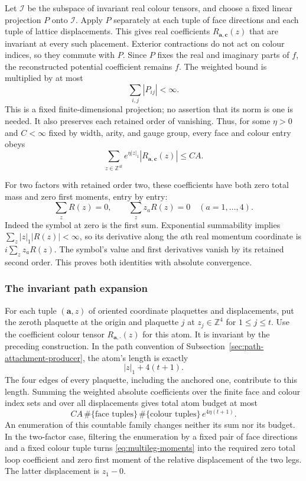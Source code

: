 Let $\mathcal I$ be the subspace of invariant real colour tensors,
and choose a fixed linear projection $P$ onto $\mathcal I$.
Apply $P$ separately at each tuple of face directions and each
tuple of lattice displacements. This gives real coefficients
$R_{\mathbf a,\mathbf c}(z)$ that are invariant at every such
placement. Exterior contractions do not act on colour indices,
so they commute with $P$. Since $P$ fixes the real and imaginary
parts of $f$, the reconstructed potential coefficient remains
$f$. The weighted bound is multiplied by at most
\[
                         \sum_{i,j}|P_{ij}|<\infty.
\]
This is a fixed finite-dimensional projection; no assertion that
its norm is one is needed. It also preserves each retained order
of vanishing. Thus, for some $\eta>0$ and $C<\infty$ fixed by
width, arity, and gauge group, every face and colour entry obeys
\begin{equation}\label{eq:multileg-real-budget}
             \sum_{z\in\mathbb Z^{4t}}
                  e^{\eta|z|_1}|R_{\mathbf a,\mathbf c}(z)|\le CA.
\end{equation}

For two factors with retained order two, these coefficients have
both zero total mass and zero first moments, entry by entry:
\begin{equation}\label{eq:multileg-moments}
             \sum_z R(z)=0,\qquad \sum_z z_aR(z)=0
                                      \quad(a=1,\ldots,4).
\end{equation}
Indeed the symbol at zero is the first sum. Exponential summability
implies $\sum_z |z|_1|R(z)|<\infty$, so its derivative along the
$a$th real momentum coordinate is $i\sum_z z_aR(z)$. The symbol's
value and first derivatives vanish by its retained second order.
This proves both identities with absolute convergence.

\subsubsection{The invariant path expansion}
For each tuple $(\mathbf a,z)$ of oriented coordinate plaquettes
and displacements, put the zeroth plaquette at the origin and
plaquette $j$ at $z_j\in\mathbb Z^4$ for $1\le j\le t$.
Use the coefficient colour tensor $R_{\mathbf a,\cdot}(z)$ for
this atom. It is invariant by the preceding construction.
In the path convention of Subsection~\ref{sec:path-attachment-producer},
the atom's length is exactly
\[
                           |z|_1+4(t+1).
\]
The four edges of every plaquette, including the anchored one,
contribute to this length. Summing the weighted absolute
coefficients over the finite face and colour index sets and over
all displacements gives total atom budget at most
\[
 CA\,\#\{\text{face tuples}\}\,
       \#\{\text{colour tuples}\}\,e^{4\eta(t+1)}.
\]
An enumeration of this countable family changes neither its sum
nor its budget. In the two-factor case, filtering the enumeration
by a fixed pair of face directions and a fixed colour tuple
turns \eqref{eq:multileg-moments} into the required zero total
loop coefficient and zero first moment of the relative displacement
of the two legs. The latter displacement is $z_1-0$.

